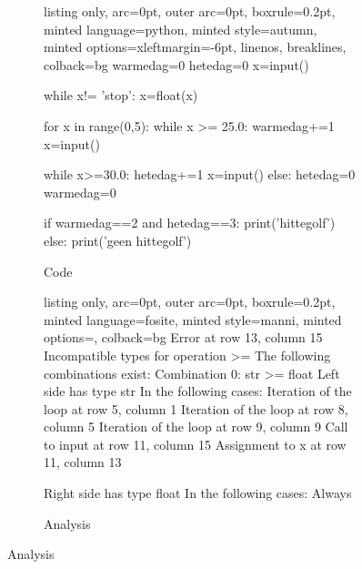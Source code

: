 
\begin{figure}[H]
\caption{Submision 6}
\label{sbm:sub6}
  \begin{subfigure}{\textwidth}
        \caption{Code}
        \label{sbm:sub6_code}

  \begin{tcblisting}{listing only, 
    arc=0pt,
    outer arc=0pt, 
    boxrule=0.2pt,
    minted language=python,
    minted style=autumn,
    minted options={xleftmargin=-6pt, linenos, breaklines},
    colback=bg }
warmedag=0
hetedag=0
x=input()

while x!= 'stop':
    x=float(x)
    
    for x in range(0,5):
        while x >= 25.0:
            warmedag+=1
            x=input()

        while x>=30.0:
            hetedag+=1
            x=input()
        else:
            hetedag=0
            warmedag=0
    
if warmedag==2 and hetedag==3:
    print('hittegolf')
else:
    print('geen hittegolf')
\end{tcblisting}
\end{subfigure}
\begin{subfigure}{\textwidth}
        \caption{Analysis}
        \label{sbm:sub6_anal}
\begin{tcblisting}{listing only, 
    arc=0pt,
    outer arc=0pt, 
    boxrule=0.2pt,
    minted language=fosite,
    minted style=manni,
    minted options={},
    colback=bg }
Error at row 13, column 15
  Incompatible types for operation >=
  The following combinations exist:
  Combination 0: str >= float
    Left side has type str
    In the following cases:
      Iteration of the loop at row 5, column 1
      Iteration of the loop at row 8, column 5
      Iteration of the loop at row 9, column 9
      Call to input at row 11, column 15
      Assignment to x at row 11, column 13

    Right side has type float
    In the following cases:
      Always
\end{tcblisting}
\end{subfigure}
\end{figure}
